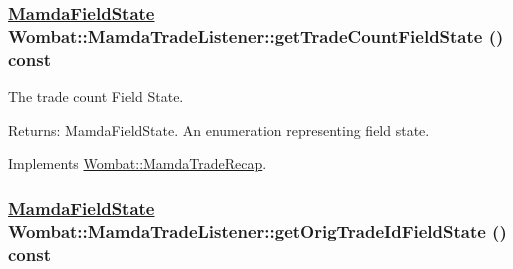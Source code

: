 \hypertarget{classWombat_1_1MamdaTradeListener_f79d9119125ef4907ba4227d1176bd04}{
\subsubsection[getTradeCountFieldState]{\setlength{\rightskip}{0pt plus 5cm}\hyperlink{namespaceWombat_93aac974f2ab713554fd12a1fa3b7d2a}{Mamda\-Field\-State} Wombat::Mamda\-Trade\-Listener::get\-Trade\-Count\-Field\-State () const}}
\label{classWombat_1_1MamdaTradeListener_f79d9119125ef4907ba4227d1176bd04}


The trade count Field State. 

\begin{Desc}
\item[Returns:]Mamda\-Field\-State. An enumeration representing field state. \end{Desc}


Implements \hyperlink{classWombat_1_1MamdaTradeRecap_6de11a97ec493b1e7fd9c843406127bc}{Wombat::Mamda\-Trade\-Recap}.\hypertarget{classWombat_1_1MamdaTradeListener_0bb23e403d65e8c21a3e9474fba0273a}{
\subsubsection[getOrigTradeIdFieldState]{\setlength{\rightskip}{0pt plus 5cm}\hyperlink{namespaceWombat_93aac974f2ab713554fd12a1fa3b7d2a}{Mamda\-Field\-State} Wombat::Mamda\-Trade\-Listener::get\-Orig\-Trade\-Id\-Field\-State () const}}
\label{classWombat_1_1MamdaTradeListener_0bb23e403d65e8c21a3e9474fba0273a}




